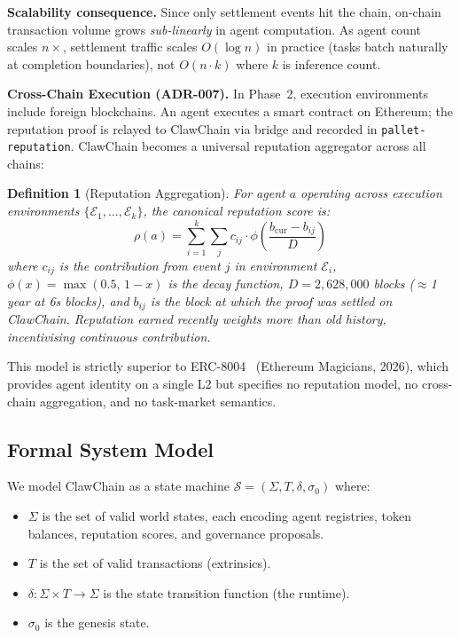 \documentclass[conference]{IEEEtran}
\newtheorem{definition}{Definition}
\begin{document}
\noindent\textbf{Scalability consequence.} Since only settlement events hit the chain, on-chain transaction volume grows \emph{sub-linearly} in agent computation. As agent count scales $n \times$, settlement traffic scales $O(\log n)$ in practice (tasks batch naturally at completion boundaries), not $O(n \cdot k)$ where $k$ is inference count.

\noindent\textbf{Cross-Chain Execution (ADR-007).} In Phase~2, execution environments include foreign blockchains. An agent executes a smart contract on Ethereum; the reputation proof is relayed to ClawChain via bridge and recorded in \texttt{pallet-reputation}. ClawChain becomes a universal reputation aggregator across all chains:

\begin{definition}[Reputation Aggregation]
For agent $a$ operating across execution environments $\{\mathcal{E}_1, \ldots, \mathcal{E}_k\}$, the canonical reputation score is:
\[
  \rho(a) = \sum_{i=1}^{k} \sum_{j} c_{ij} \cdot \phi\!\left(\frac{b_{\mathrm{cur}} - b_{ij}}{D}\right)
\]
where $c_{ij}$ is the contribution from event $j$ in environment $\mathcal{E}_i$, $\phi(x) = \max(0.5,\, 1 - x)$ is the decay function, $D = 2{,}628{,}000$ blocks ($\approx$1 year at 6s blocks), and $b_{ij}$ is the block at which the proof was settled on ClawChain. Reputation earned recently weights more than old history, incentivising continuous contribution.
\end{definition}

\noindent This model is strictly superior to ERC-8004~\cite{erc8004} (Ethereum Magicians, 2026), which provides agent identity on a single L2 but specifies no reputation model, no cross-chain aggregation, and no task-market semantics.

\subsection{Formal System Model}

We model ClawChain as a state machine $\mathcal{S} = (\Sigma, T, \delta, \sigma_0)$ where:
\begin{itemize}
    \item $\Sigma$ is the set of valid world states, each encoding agent registries, token balances, reputation scores, and governance proposals.
    \item $T$ is the set of valid transactions (extrinsics).
    \item $\delta: \Sigma \times T \rightarrow \Sigma$ is the state transition function (the runtime).
    \item $\sigma_0$ is the genesis state.
\end{itemize}
\end{document}

